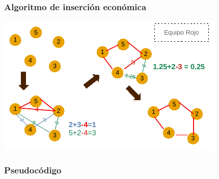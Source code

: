 \documentclass[13pt]{beamer}
\begin{document}
\begin{frame}
\begin{center}
			\end{center}
	\end{frame}


    \begin{frame}
		\frametitle{Algoritmo de inserción económica}
		\begin{center}
			\includegraphics[scale=1.5]{./img/DibInsercion.pdf}
		\end{center}
	\end{frame}

	\begin{frame}
		\frametitle{Pseudocódigo}
		
	\end{frame}
\end{document}
